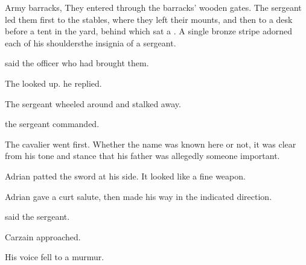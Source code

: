 \stamp
  {\dateCarzainGoesToMalcur}
  {Army barracks, }
They entered through the barracks' wooden gates. 
The sergeant led them first to the stables, where they left their mounts, and then to a desk before a tent in the yard, behind which sat a \dax{}. 
A single bronze stripe adorned each of his shoulders\dash the insignia of a sergeant.%

 said the officer who had brought them.

The \dax{} looked up. 
 he replied.



The \human{} sergeant wheeled around and stalked away. 

 the \scathaese{} sergeant commanded. 

The cavalier went first. 
Whether the name was known here or not, it was clear from his tone and stance that his father was allegedly someone important. 


Adrian patted the sword at his side. It looked like a fine weapon. 




Adrian gave a curt salute, then made his way in the indicated direction. 

 said the sergeant. 

Carzain approached. 


His voice fell to a murmur.


